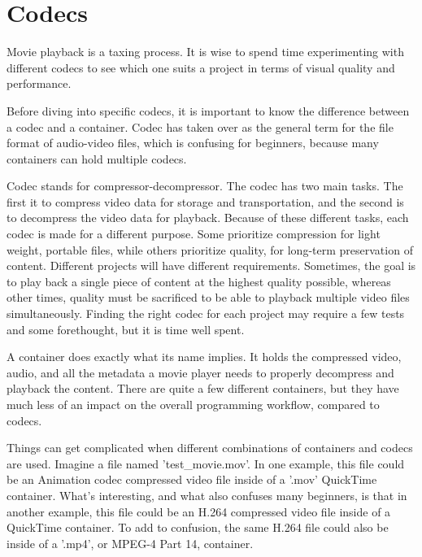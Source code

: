 
\section{Codecs}

\begin{fullwidth}
Movie playback is a taxing process. It is wise to spend time experimenting with different codecs to see which one suits a project in terms of visual quality and performance.

Before diving into specific codecs, it is important to know the difference between a codec and a container. Codec has taken over as the general term for the file format of audio-video files, which is confusing for beginners, because many containers can hold multiple codecs. 

Codec stands for compressor-decompressor. The codec has two main tasks. The first it to compress video data for storage and transportation, and the second is to decompress the video data for playback. Because of these different tasks, each codec is made for a different purpose. Some prioritize compression for light weight, portable files, while others prioritize quality, for long-term preservation of content. Different projects will have different requirements. Sometimes, the goal is to play back a single piece of content at the highest quality possible, whereas other times, quality must be sacrificed to be able to playback multiple video files simultaneously. Finding the right codec for each project may require a few tests and some forethought, but it is time well spent. 

A container does exactly what its name implies. It holds the compressed video, audio, and all the metadata a movie player needs to properly decompress and playback the content. There are quite a few different containers, but they have much less of an impact on the overall programming workflow, compared to codecs. 

Things can get complicated when different combinations of containers and codecs are used. Imagine a file named 'test\_movie.mov'. In one example, this file could be an Animation codec compressed video file inside of a '.mov' QuickTime container. What's interesting, and what also confuses many beginners, is that in another example, this file could be an H.264 compressed video file inside of a QuickTime container. To add to confusion, the same H.264 file could also be inside of a '.mp4', or MPEG-4 Part 14, container. 


\end{fullwidth}
